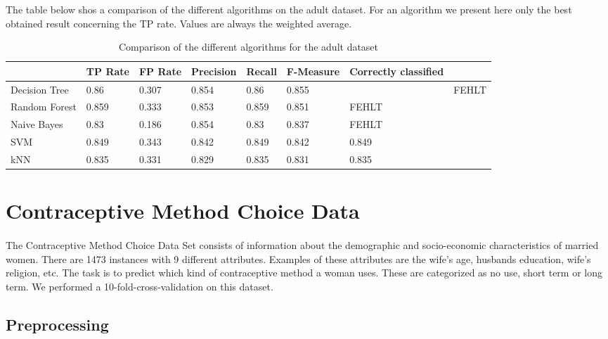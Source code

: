 \documentclass[paper=a4, fontsize=11pt]{scrartcl} %
\numberwithin{equation}{section} %
\numberwithin{figure}{section} %
\numberwithin{table}{section} %
\begin{document}
The table below shos a comparison of the different algorithms on the adult dataset. For an algorithm we present here only the best obtained result concerning the TP rate. Values are always the weighted average.

\begin{table}[h]
\centering
\begin{tabular}{llllllll}
	\toprule
									&TP Rate   	&FP Rate   &Precision &Recall  &F-Measure   &  Correctly classified\\
	\midrule
	Decision Tree		& 0.86    	& 0.307   	& 0.854   & 0.86   & 0.855     & 		& FEHLT\\
  Random Forest		& 0.859   	& 0.333   	& 0.853   & 0.859  & 0.851     	& FEHLT\\
  Naive Bayes		 	& 0.83    	& 0.186   	& 0.854   & 0.83   & 0.837     	& FEHLT\\
  SVM							& 0.849    	& 0.343     &0.842   	&0.849   &0.842     	& 0.849\\
  kNN							&0.835     	&0.331      &0.829    &0.835   &0.831				& 0.835\\
	\bottomrule
\end{tabular}
\caption{Comparison of the different algorithms for the adult dataset}
\end{table}





\section{Contraceptive Method Choice Data}

\paragraph{}The Contraceptive Method Choice Data Set consists of information about the demographic and socio-economic characteristics of married women. There are 1473 instances with 9 different attributes. Examples of these attributes are the wife's age, husbands education, wife's religion, etc. The task is to predict which kind of contraceptive method a woman uses. These are categorized as no use, short term or long term. We performed a 10-fold-cross-validation on this dataset.

\subsection{Preprocessing}
\end{document}
